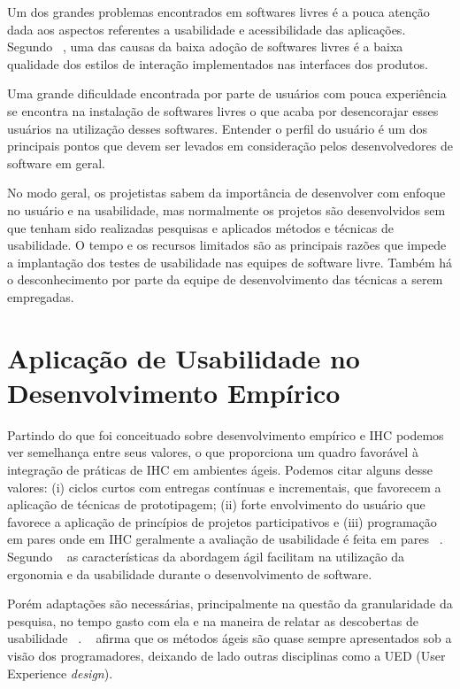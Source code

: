 Um dos grandes problemas encontrados em softwares livres é a pouca atenção dada aos aspectos referentes a usabilidade e acessibilidade das aplicações. 
%
Segundo ~, uma das causas da baixa adoção de softwares livres é a baixa qualidade dos estilos de interação implementados nas interfaces dos produtos. 

Uma grande dificuldade encontrada por parte de usuários com pouca experiência se encontra na instalação de softwares livres o que acaba por desencorajar esses usuários na utilização desses softwares. Entender o perfil do usuário é um dos principais pontos que devem ser levados em consideração pelos desenvolvedores de software em geral. 

No modo geral, os projetistas sabem da importância de desenvolver com enfoque no usuário e na usabilidade, mas normalmente os projetos são desenvolvidos sem que tenham sido realizadas pesquisas e aplicados métodos e técnicas de usabilidade.
%	
O tempo e os recursos limitados são as principais razões que impede a implantação dos testes de usabilidade nas equipes de software livre. Também há o desconhecimento por parte da equipe de desenvolvimento das técnicas a serem empregadas.
%
\section{Aplicação de Usabilidade no Desenvolvimento Empírico}

	Partindo do que foi conceituado sobre desenvolvimento empírico e IHC podemos ver semelhança entre seus valores, o que proporciona um quadro favorável à integração de práticas de IHC em ambientes ágeis. Podemos citar alguns desse valores: (i) ciclos curtos com entregas contínuas e incrementais, que favorecem a aplicação de técnicas de prototipagem; (ii) forte envolvimento do usuário que favorece a aplicação de princípios de projetos participativos e (iii) programação em pares onde em IHC geralmente a avaliação de usabilidade é feita em pares ~\cite{barbosa2008estrategia}. 
	Segundo ~ as características da abordagem ágil facilitam na utilização da ergonomia e da usabilidade durante o desenvolvimento de software.
		
	Porém adaptações são necessárias, principalmente na questão da granularidade da pesquisa, no tempo gasto com ela e na maneira de relatar as descobertas de usabilidade ~\cite{santos2012}.
	~ afirma que os métodos ágeis são quase sempre apresentados sob a visão dos programadores, deixando de lado outras disciplinas como a UED (User Experience \emph{design}). 


